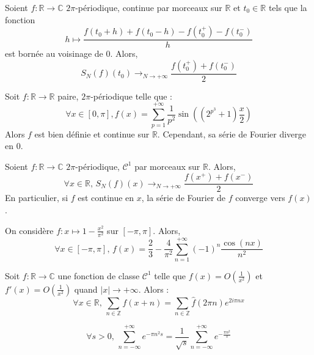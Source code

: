 
  \begin{theorem}[Dirichlet]
    Soient $f : \mathbb{R} \rightarrow \mathbb{C}$ $2\pi$-périodique, continue par morceaux sur $\mathbb{R}$ et $t_0 \in \mathbb{R}$ tels que la fonction
    \[ h \mapsto \frac{f(t_0 + h) + f(t_0 - h) - f(t_0^+) - f(t_0^-)}{h} \]
    est bornée au voisinage de $0$. Alors,
    \[ S_N(f)(t_0) \longrightarrow_{N \rightarrow +\infty} \frac{f(t_0^+) + f(t_0^-)}{2} \]
  \end{theorem}

  \begin{cexample}
    Soit $f : \mathbb{R} \rightarrow \mathbb{R}$ paire, $2\pi$-périodique telle que :
    \[ \forall x \in [0, \pi], f(x) = \sum_{p=1}^{+\infty} \frac{1}{p^2} \sin \left( (2^{p^3} + 1) \frac{x}{2} \right)
    \]
    Alors $f$ est bien définie et continue sur $\mathbb{R}$. Cependant, sa série de Fourier diverge en $0$.
  \end{cexample}

  \begin{corollary}
    Soient $f : \mathbb{R} \rightarrow \mathbb{C}$ $2\pi$-périodique, $\mathcal{C}^1$ par morceaux sur $\mathbb{R}$. Alors,
    \[ \forall x \in \mathbb{R}, \, S_N(f)(x) \longrightarrow_{N \rightarrow +\infty} \frac{f(x^+) + f(x^-)}{2} \]
    En particulier, si $f$ est continue en $x$, la série de Fourier de $f$ converge vers $f(x)$.
  \end{corollary}

  \begin{example}
    On considère $f : x \mapsto 1 - \frac{x^2}{\pi^2}$ sur $[-\pi, \pi]$. Alors,
    \[ \forall x \in [-\pi, \pi], \, f(x) = \frac{2}{3} - \frac{4}{\pi^2} \sum_{n=1}^{+\infty} (-1)^n \frac{\cos(nx)}{n^2} \]
  \end{example}


  \begin{theorem}
    Soit $f : \mathbb{R} \rightarrow \mathbb{C}$ une fonction de classe $\mathcal{C}^1$ telle que $f(x) = O \left( \frac{1}{x^2} \right)$ et $f'(x) = O \left( \frac{1}{x^2} \right)$ quand $|x| \longrightarrow +\infty$. Alors :
    \[ \forall x \in \mathbb{R}, \, \sum_{n \in \mathbb{Z}} f(x+n) = \sum_{n \in \mathbb{Z}} \widehat{f}(2 \pi n) e^{2 i \pi n x} \]
  \end{theorem}

  \begin{application}
    \[ \forall s > 0, \, \sum_{n=-\infty}^{+\infty} e^{-\pi n^2 s} = \frac{1}{\sqrt{s}} \sum_{n=-\infty}^{+\infty} e^{-\frac{\pi n^2}{s}} \]
  \end{application}

